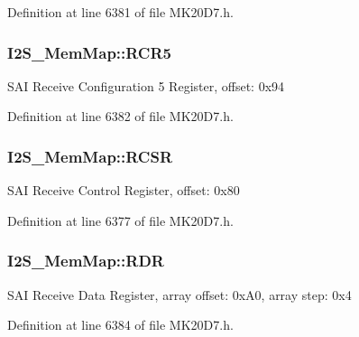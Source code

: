 Definition at line 6381 of file M\+K20\+D7.\+h.

\subsubsection[{\texorpdfstring{R\+C\+R5}{RCR5}}]{ I2\+S\+\_\+\+Mem\+Map\+::\+R\+C\+R5}\hypertarget{struct_i2_s___mem_map_ada5677c98d1cf918e91389e40256159a}{}\label{struct_i2_s___mem_map_ada5677c98d1cf918e91389e40256159a}
S\+AI Receive Configuration 5 Register, offset\+: 0x94 

Definition at line 6382 of file M\+K20\+D7.\+h.

\subsubsection[{\texorpdfstring{R\+C\+SR}{RCSR}}]{ I2\+S\+\_\+\+Mem\+Map\+::\+R\+C\+SR}\hypertarget{struct_i2_s___mem_map_adf26fb4a1039d9061d9a23093e1624f5}{}\label{struct_i2_s___mem_map_adf26fb4a1039d9061d9a23093e1624f5}
S\+AI Receive Control Register, offset\+: 0x80 

Definition at line 6377 of file M\+K20\+D7.\+h.

\subsubsection[{\texorpdfstring{R\+DR}{RDR}}]{ I2\+S\+\_\+\+Mem\+Map\+::\+R\+DR}\hypertarget{struct_i2_s___mem_map_a55bafff0bd1460745f42d2a0e92f29aa}{}\label{struct_i2_s___mem_map_a55bafff0bd1460745f42d2a0e92f29aa}
S\+AI Receive Data Register, array offset\+: 0x\+A0, array step\+: 0x4 

Definition at line 6384 of file M\+K20\+D7.\+h.

